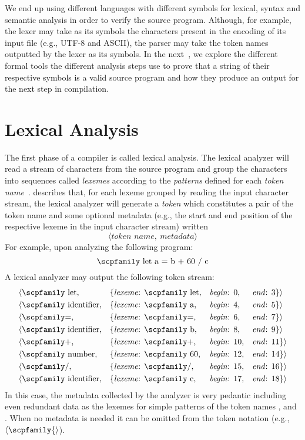 \documentclass[
  oneside,
  english,
  coorientadorbanca,
  noabntexcite
]{ufsc-thesis-rn46-2019}
\newcommand{\codett}[1]{\text{\scpfamily#1}}
\newcommand{\token}[1]{$\langle\codett{#1}\rangle$}
\newcommand{\tokenstream}[4]{
  & \langle\text{#1,} && \text{\{\textit{lexeme}: #2,} && \text{\textit{begin}: #3,} && \text{\textit{end}: #4\}}\rangle%
}
\begin{document}
We end up using different languages with different symbols for lexical, syntax and semantic analysis in order to verify the source program.
Although, for example, the lexer may take as its symbols the characters present in the encoding of its input file (e.g., UTF-8 and ASCII), the parser may take the token names outputted by the lexer as its symbols.
In the next~, we explore the different formal tools the different analysis steps use to prove that a string of their respective symbols is a valid source program and how they produce an output for the next step in compilation.

\section{Lexical Analysis}\label{chapter:background:sec:lexical}

The first phase of a compiler is called lexical analysis.
The lexical analyzer will read a stream of characters from the source program and group the characters into sequences called \textit{lexemes} according to the \textit{patterns} defined for each \textit{token name}~\cite{Aho:2006:CPT:1177220}.
\textcite{Aho:2006:CPT:1177220} describes that, for each lexeme grouped by reading the input character stream, the lexical analyzer will generate a \textit{token} which constitutes a pair of the token name and some optional metadata (e.g., the start and end position of the respective lexeme in the input character stream) written
\begin{equation*}
  \langle \textit{token name},\ \textit{metadata}\rangle
\end{equation*}
For example, upon analyzing the following program:
\begin{equation*}
  \codett{let a = b + 60 / c}
\end{equation*}
A lexical analyzer may output the following token stream:
\begin{equation}\label{figure:introduction_token_stream}
  \begin{aligned}
    \tokenstream{\codett{let}}{\codett{let}}{$0$}{$3$}      \\
    \tokenstream{\codett{identifier}}{\codett{a}}{$4$}{$5$} \\
    \tokenstream{\codett{=}}{\codett{=}}{$6$}{$7$}          \\
    \tokenstream{\codett{identifier}}{\codett{b}}{$8$}{$9$} \\
    \tokenstream{\codett{+}}{\codett{+}}{$10$}{$11$}        \\
    \tokenstream{\codett{number}}{\codett{60}}{$12$}{$14$}  \\
    \tokenstream{\codett{/}}{\codett{/}}{$15$}{$16$}        \\
    \tokenstream{\codett{identifier}}{\codett{c}}{$17$}{$18$}
  \end{aligned}
\end{equation}
In this case, the metadata collected by the analyzer is very pedantic including even redundant data as the lexemes for simple patterns of the token names \codett{=}, \codett{+} and \codett{/}.
When no metadata is needed it can be omitted from the token notation (e.g., \token{\{}).
\end{document}
